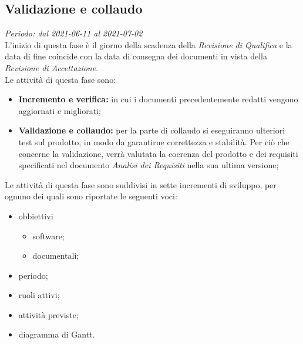 \subsection{Validazione e collaudo}
\textit{Periodo: dal 2021-06-11 al 2021-07-02}\\
L'inizio di questa fase è il giorno della scadenza della \textit{Revisione di Qualifica} e la data di fine coincide con la data di consegna dei documenti in vista della \textit{Revisione di Accettazione}.\\
Le attività di questa fase sono:
\begin{itemize}
    \item \textbf{Incremento e verifica:} in cui i documenti precedentemente redatti vengono aggiornati e migliorati;
    \item \textbf{Validazione e collaudo:} per la parte di collaudo si eseguiranno ulteriori test sul prodotto, in modo da garantirne correttezza e stabilità. Per ciò che concerne la validazione, verrà valutata la coerenza del prodotto e dei requisiti specificati nel documento \textit{Analisi dei Requisiti} nella sua ultima versione;
\end{itemize}
Le attività di questa fase sono suddivisi in sette incrementi di sviluppo, per ognuno dei quali sono riportate le seguenti voci:
\begin{itemize}
    \item obbiettivi
          \begin{itemize}
              \item software;
              \item documentali;
          \end{itemize}
    \item periodo;
    \item ruoli attivi;
    \item attività previste;
    \item diagramma di Gantt.
\end{itemize}

